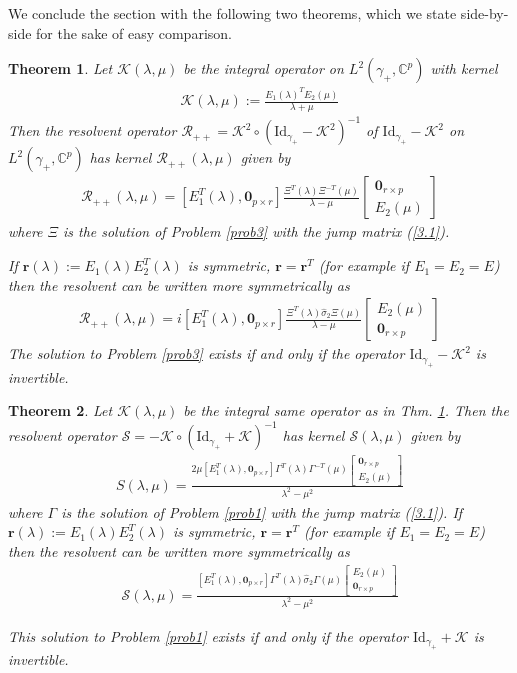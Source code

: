 \documentclass{article}
\newtheorem{theorem}{Theorem}[section]
\def\r{ {\mathbf r}}
\def \C{{\mathbf C}}
\def \K{{\mathcal K}}
\def\s{\sigma}
\def\C{{\mathbb C}}
\def\wh{\widehat}
\def\Id{\mathrm{Id}}
\def\0{{\mathbf 0}}
\newcommand{\be}{\begin{eqnarray}}
\newcommand{\ee}{\end{eqnarray}}
\def\le{\left}
\def\ri{\right}
\begin{document}
We conclude the section with the following two theorems, which we state side-by-side for the sake of easy comparison.
%
%
\begin{shaded}
\begin{theorem}
\label{thmXi}
Let $\K(\lambda,\mu)$ be the integral operator on $L^2(\gamma_+,\C^p)$ with kernel 
\be
\mathcal K(\lambda,\mu):= \frac{E_1(\lambda)^TE_2(\mu)}{\lambda+\mu}\label{Kzwt}
\ee 
Then the resolvent operator $\mathcal R_{++} = \K^2\circ(\Id_{\gamma_+} -\K^2)^{-1}$ of $\Id_{\gamma_+} - \K^2$ on $L^2(\gamma_+,\C^p)$  has kernel $\mathcal R_{++}(\lambda,\mu)$ given by 
\be
\mathcal R_{++}(\lambda,\mu) =  
[
E_1^T(\lambda)
,
\0_{p\times r}
] 
\frac{\Xi^{T}(\lambda)\Xi^{-T}(\mu)}{\lambda - \mu}\le[
\begin{array}{c}
\0_{r\times p}
\\
\!\!\! E_2(\mu)\!\!\! 
\end{array}
\ri]
\ee
where $\Xi$ is the solution of Problem \ref{prob3}  with the jump matrix (\ref{3.1}).

If  $\r(\lambda):= E_1(\lambda)E_2^T(\lambda)$ is symmetric, $\r=\r^T$ (for example if $E_1=E_2=E$) 
then the resolvent can be written more symmetrically as 
\be
\mathcal R_{++}(\lambda,\mu) = 
i [
E_1^T(\lambda)
,
\0_{p\times r}
] 
\frac{\Xi^T(\lambda)\wh \s_2 \Xi(\mu)}{\lambda - \mu}\le[
\begin{array}{c}
\!\!\! E_2(\mu)\!\!\! 
\\
\0_{r\times p}
\end{array}
\ri]
\ee
The solution to Problem \ref{prob3} exists if and only if the operator $\Id_{\gamma_+} -\K^2$ is invertible.
\end{theorem}
\end{shaded}
%
%
\begin{shaded}
\begin{theorem}
\label{thmGamma}
Let $\K(\lambda,\mu)$ be the integral same operator as in Thm. \ref{thmXi}. 
Then the resolvent operator $\mathcal S = -\K\circ (\Id_{\gamma_+} + \K)^{-1}$ has kernel $\mathcal S(\lambda,\mu)$ given by 
\be
S(\lambda,\mu)  =
\frac {2 \mu \le[E_1^T(\lambda),\0_{p\times r} \ri] \Gamma^{T}(\lambda) \Gamma^{-T}(\mu) 
\le[\begin{array}{c}
\0_{r\times p} 
\\
E_2(\mu)
\end{array} \ri]}{\lambda^2  - \mu^2}
\ee
where $\Gamma$ is the solution of Problem \ref{prob1} with the jump matrix (\ref{3.1}).
If  $\r(\lambda):= E_1(\lambda)E_2^T(\lambda)$ is symmetric, $\r=\r^T$ (for example if $E_1=E_2=E$) then the resolvent can be written more symmetrically as 
\be
\mathcal S(\lambda,\mu) =
\frac{ \le[
 E_1^T(\lambda)
  ,
 \0_{p\times r}
   \ri] \Gamma^{T}(\lambda) \wh \s_2 \Gamma (\mu) 
\le[\begin{array}{c}
  E_2(\mu)
\\
\0_{r\times p} 
\end{array} \ri]}{\lambda^2  - \mu^2}
\ee

 This solution to Problem \ref{prob1} exists if and only if the operator $\Id_{\gamma_+} +
 \K$ is invertible.
\end{theorem}
\end{shaded}
%
\end{document}
